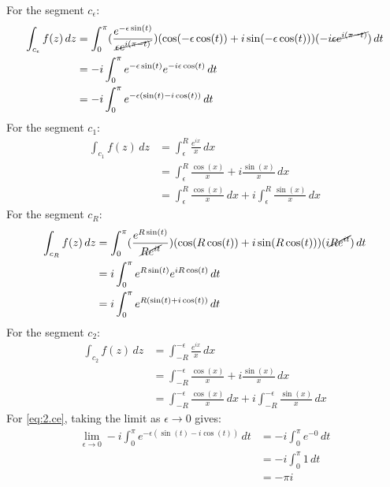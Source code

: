 \documentclass[a4paper, titlepage, DIV=14]{scrartcl}
\begin{document}
    For the segment $c_{\epsilon}$:
    \begin{align}
        \int_{c_{\epsilon}} f(z) \, dz &= \int_{0}^{\pi}(\frac{e^{-\epsilon\sin(t)}}
            {\cancel{\epsilon e^{i(\pi-t)}}})(\cos(-\epsilon\cos(t)) + i\sin(-\epsilon\cos(t)))
            (-i\cancel{\epsilon e^{i(\pi-t)}}) \, dt \nonumber\\
            &= -i\int_{0}^{\pi}e^{-\epsilon\sin(t)}e^{-i\epsilon\cos(t)} \, dt \nonumber \\
            &= -i\int_{0}^{\pi}e^{-\epsilon(\sin(t)-i\cos(t))} \, dt \label{eq:2.ce} 
    \end{align}
    For the segment $c_{1}$:
    \begin{align}
        \int_{c_{1}} f(z) \, dz &= \int_{\epsilon}^{R} \frac{e^{ix}}{x} \, dx \nonumber\\
            &= \int_{\epsilon}^{R} \frac{\cos(x)}{x} + i\frac{\sin(x)}{x} \, dx \nonumber\\
            &= \int_{\epsilon}^{R} \frac{\cos(x)}{x} \, dx + i\int_{\epsilon}^{R} \frac{\sin(x)}{x} \, dx \label{eq:2.c1}
    \end{align} 
    For the segment $c_{R}$:
    \begin{align}
        \int_{c_{R}} f(z) \, dz &= \int_{0}^{\pi} (\frac{e^{R\sin(t)}}{\cancel{Re^{it}}})(\cos(R\cos(t)) + i\sin(R\cos(t)))(i\cancel{Re^{it}}) \, dt \nonumber\\
            &= i\int_{0}^{\pi}e^{R\sin(t)}e^{iR\cos(t)} \, dt \nonumber\\
            &= i\int_{0}^{\pi}e^{R(\sin(t)+i\cos(t))} \, dt \label{eq:2.cr} 
    \end{align}
    For the segment $c_{2}$:
    \begin{align}
        \int_{c_{2}} f(z) \, dz &= \int_{-R}^{-\epsilon} \frac{e^{ix}}{x} \, dx \nonumber\\
            &= \int_{-R}^{-\epsilon} \frac{\cos(x)}{x} + i\frac{\sin(x)}{x} \, dx \nonumber\\
            &= \int_{-R}^{-\epsilon} \frac{\cos(x)}{x} \, dx + i\int_{-R}^{-\epsilon} \frac{\sin(x)}{x} \, dx \label{eq:2.c2}
    \end{align} 
    For \eqref{eq:2.ce}, taking the limit as $\epsilon\to0$ gives:
    \begin{align}
        \lim_{\epsilon\to0} -i\int_{0}^{\pi}e^{-\epsilon(\sin(t)-i\cos(t))} \, dt &= -i\int_{0}^{\pi}e^{-0} \, dt \nonumber \\
            &= -i\int_{0}^{\pi} 1 \, dt \nonumber\\
            &= -\pi i \label{eq:2.limce}
    \end{align}
\end{document}
